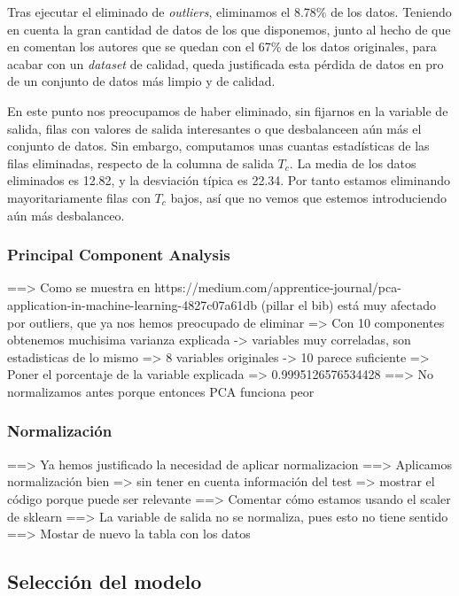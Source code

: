 \documentclass[11pt]{article}
\begin{document}
Tras ejecutar el eliminado de \emph{outliers}, eliminamos el 8.78\% de los datos. Teniendo en cuenta la gran cantidad de datos de los que disponemos, junto al hecho de que en \cite{original_paper_reg:paper} comentan los autores que se quedan con el 67\% de los datos originales, para acabar con un \emph{dataset} de calidad, queda justificada esta pérdida de datos en pro de un conjunto de datos más limpio y de calidad.

En este punto nos preocupamos de haber eliminado, sin fijarnos en la variable de salida, filas con valores de salida interesantes o que desbalanceen aún más el conjunto de datos. Sin embargo, computamos unas cuantas estadísticas de las filas eliminadas, respecto de la columna de salida $T_c$. La media de los datos eliminados es 12.82, y la desviación típica es 22.34. Por tanto estamos eliminando mayoritariamente filas con $T_c$ bajos, así que no vemos que estemos introduciendo aún más desbalanceo.

\subsubsection{Principal Component Analysis}

==> Como se muestra en https://medium.com/apprentice-journal/pca-application-in-machine-learning-4827c07a61db (pillar el bib) está muy afectado por outliers, que ya nos hemos preocupado de eliminar
=> Con 10 componentes obtenemos muchisima varianza explicada -> variables muy correladas, son estadisticas de lo mismo
=> 8 variables originales -> 10 parece suficiente
=> Poner el porcentaje de la variable explicada
        => 0.9995126576534428
==> No normalizamos antes porque entonces PCA funciona peor

\subsubsection{Normalización}

==> Ya hemos justificado la necesidad de aplicar normalizacion
==> Aplicamos normalización bien => sin tener en cuenta información del test => mostrar el código porque puede ser relevante
==> Comentar cómo estamos usando el scaler de sklearn
==> La variable de salida no se normaliza, pues esto no tiene sentido
==> Mostar de nuevo la tabla con los datos

\subsection{Selección del modelo}
\end{document}
